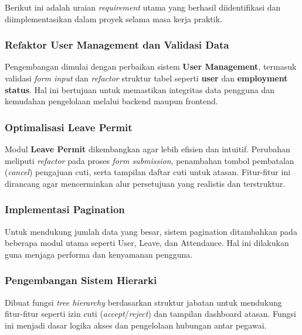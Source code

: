 Berikut ini adalah uraian \textit{requirement} utama yang berhasil diidentifikasi dan diimplementasikan dalam proyek selama masa kerja praktik.
\subsubsection{Refaktor User Management dan Validasi Data}

Pengembangan dimulai dengan perbaikan sistem \textbf{User Management}, termasuk validasi \textit{form input} dan \textit{refactor} struktur tabel seperti \textbf{user} dan \textbf{employment status}. Hal ini bertujuan untuk memastikan integritas data pengguna dan kemudahan pengelolaan melalui backend maupun frontend.
\subsubsection{Optimalisasi Leave Permit}

Modul \textbf{Leave Permit} dikembangkan agar lebih efisien dan intuitif. Perubahan meliputi \textit{refactor} pada proses \textit{form submission}, penambahan tombol pembatalan (\textit{cancel}) pengajuan cuti, serta tampilan daftar cuti untuk atasan. Fitur-fitur ini dirancang agar mencerminkan alur persetujuan yang realistis dan terstruktur.
\subsubsection{Implementasi Pagination}

Untuk mendukung jumlah data yang besar, sistem pagination ditambahkan pada beberapa modul utama seperti User, Leave, dan Attendance. Hal ini dilakukan guna menjaga performa dan kenyamanan pengguna.
\subsubsection{Pengembangan Sistem Hierarki}

Dibuat fungsi \textit{tree hierarchy} berdasarkan struktur jabatan untuk mendukung fitur-fitur seperti izin cuti (\textit{accept}/\textit{reject}) dan tampilan dashboard atasan. Fungsi ini menjadi dasar logika akses dan pengelolaan hubungan antar pegawai.
